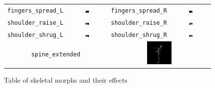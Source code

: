 \documentclass[../../main.tex]{subfiles}
\begin{document}
\begin{figure}
\begin{tabular}{|c|c|c|c|}
        \texttt{fingers\_spread\_L} & \includegraphics[width=0.1\textwidth]{chapters/avatar_creation_pose_synthesis/images/morph_renders/fingers_spread_L_morph.png} &
        \texttt{fingers\_spread\_R} & \includegraphics[width=0.1\textwidth]{chapters/avatar_creation_pose_synthesis/images/morph_renders/fingers_spread_R_morph.png} \\

        \texttt{shoulder\_raise\_L} & \includegraphics[width=0.1\textwidth]{chapters/avatar_creation_pose_synthesis/images/morph_renders/shoulder_raise_L_morph.png} &
        \texttt{shoulder\_raise\_R} & \includegraphics[width=0.1\textwidth]{chapters/avatar_creation_pose_synthesis/images/morph_renders/shoulder_raise_R_morph.png} \\

        \texttt{shoulder\_shrug\_L} & \includegraphics[width=0.1\textwidth]{chapters/avatar_creation_pose_synthesis/images/morph_renders/shoulder_shrug_L_morph.png} &
        \texttt{shoulder\_shrug\_R} & \includegraphics[width=0.1\textwidth]{chapters/avatar_creation_pose_synthesis/images/morph_renders/shoulder_shrug_R_morph.png} \\

        \hline
        \multicolumn{2}{|c|}{\texttt{spine\_extended}} &
        \multicolumn{2}{c|}{\centering\includegraphics[width=0.25\textwidth]{chapters/avatar_creation_pose_synthesis/images/morph_renders/spine_extended_morph.png}} \\
        \hline
    \end{tabular}
    \caption{Table of skeletal morphs and their effects}
    \label{fig:skeletal_morphs}
\end{figure}
\end{document}
